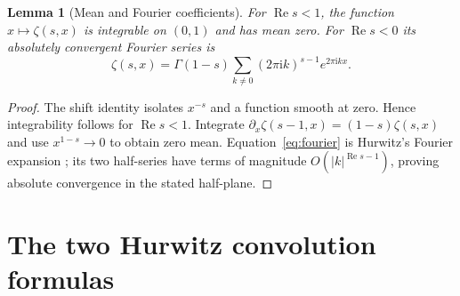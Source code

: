 \documentclass[11pt]{article}
\numberwithin{equation}{section}
\newtheorem{lemma}[theorem]{Lemma}
\theoremstyle{definition}\newtheorem{definition}[theorem]{Definition}
\theoremstyle{remark}\newtheorem{remark}[theorem]{Remark}
\DeclareMathOperator{\Rea}{Re}
\newcommand{\iu}{\mathrm i}
\begin{document}
\begin{lemma}[Mean and Fourier coefficients]\label{lem:fourier}
For $\Rea s<1$, the function $x\mapsto\zeta(s,x)$ is integrable on $(0,1)$
and has mean zero. For $\Rea s<0$ its absolutely convergent Fourier series is
\begin{equation}\label{eq:fourier}
 \zeta(s,x)=\Gamma(1-s)\sum_{k\ne0}
                     (2\pi\iu k)^{s-1}e^{2\pi\iu kx}.
\end{equation}
\end{lemma}
\begin{proof}
The shift identity isolates $x^{-s}$ and a function smooth at zero.
Hence integrability follows for $\Rea s<1$. Integrate
$\partial_x\zeta(s-1,x)=(1-s)\zeta(s,x)$ and use
$x^{1-s}\to0$ to obtain zero mean. Equation~\eqref{eq:fourier} is
Hurwitz's Fourier expansion \cite[25.11.9]{DLMFHurwitz}; its two half-series
have terms of magnitude $O(|k|^{\Rea s-1})$, proving absolute convergence
in the stated half-plane.
\end{proof}

\section{The two Hurwitz convolution formulas}
\label{sec:hurwitz}
\end{document}

